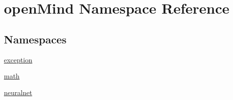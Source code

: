 \hypertarget{namespaceopen_mind}{\section{open\+Mind Namespace Reference}
\label{namespaceopen_mind}
}
\subsection*{Namespaces}
\begin{DoxyCompactItemize}
\item 
 \hyperlink{namespaceopen_mind_1_1exception}{exception}
\item 
 \hyperlink{namespaceopen_mind_1_1math}{math}
\item 
 \hyperlink{namespaceopen_mind_1_1neuralnet}{neuralnet}
\end{DoxyCompactItemize}
